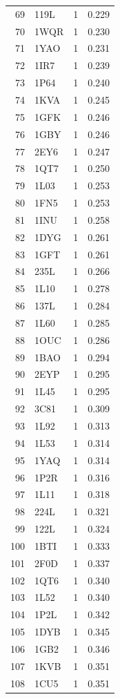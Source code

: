 \begin{longtable}{r l r r}
69 & 119L & 1 & 0.229 \\
70 & 1WQR & 1 & 0.230 \\
71 & 1YAO & 1 & 0.231 \\
72 & 1IR7 & 1 & 0.239 \\
73 & 1P64 & 1 & 0.240 \\
74 & 1KVA & 1 & 0.245 \\
75 & 1GFK & 1 & 0.246 \\
76 & 1GBY & 1 & 0.246 \\
77 & 2EY6 & 1 & 0.247 \\
78 & 1QT7 & 1 & 0.250 \\
79 & 1L03 & 1 & 0.253 \\
80 & 1FN5 & 1 & 0.253 \\
81 & 1INU & 1 & 0.258 \\
82 & 1DYG & 1 & 0.261 \\
83 & 1GFT & 1 & 0.261 \\
84 & 235L & 1 & 0.266 \\
85 & 1L10 & 1 & 0.278 \\
86 & 137L & 1 & 0.284 \\
87 & 1L60 & 1 & 0.285 \\
88 & 1OUC & 1 & 0.286 \\
89 & 1BAO & 1 & 0.294 \\
90 & 2EYP & 1 & 0.295 \\
91 & 1L45 & 1 & 0.295 \\
92 & 3C81 & 1 & 0.309 \\
93 & 1L92 & 1 & 0.313 \\
94 & 1L53 & 1 & 0.314 \\
95 & 1YAQ & 1 & 0.314 \\
96 & 1P2R & 1 & 0.316 \\
97 & 1L11 & 1 & 0.318 \\
98 & 224L & 1 & 0.321 \\
99 & 122L & 1 & 0.324 \\
100 & 1BTI & 1 & 0.333 \\
101 & 2F0D & 1 & 0.337 \\
102 & 1QT6 & 1 & 0.340 \\
103 & 1L52 & 1 & 0.340 \\
104 & 1P2L & 1 & 0.342 \\
105 & 1DYB & 1 & 0.345 \\
106 & 1GB2 & 1 & 0.346 \\
107 & 1KVB & 1 & 0.351 \\
108 & 1CU5 & 1 & 0.351 \\

\end{longtable}
